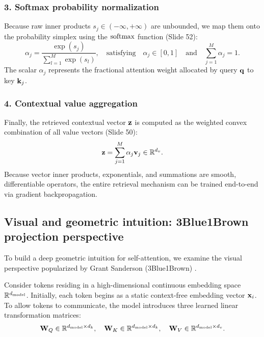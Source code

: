 \documentclass[../../main.tex]{subfiles}
\begin{document}
\subsubsection{3. Softmax probability normalization}
Because raw inner products $s_j \in (-\infty, +\infty)$ are unbounded, we map them onto the probability simplex using the $\operatorname{\mathrm{softmax}}$ function (Slide 52):
\begin{equation}
\label{eq:softmax_weight_def}
\alpha_j = \frac{\exp(s_j)}{\sum_{l=1}^M \exp(s_l)}, \quad \text{satisfying} \quad \alpha_j \in [0, 1] \quad \text{and} \quad \sum_{j=1}^M \alpha_j = 1.
\end{equation}
The scalar $\alpha_j$ represents the fractional attention weight allocated by query $\mathbf{q}$ to key $\mathbf{k}_j$.

\subsubsection{4. Contextual value aggregation}
Finally, the retrieved contextual vector $\mathbf{z}$ is computed as the weighted convex combination of all value vectors (Slide 50):
\begin{equation}
\label{eq:convex_combination_values}
\mathbf{z} = \sum_{j=1}^M \alpha_j \mathbf{v}_j \in \mathbb{R}^{d_v}.
\end{equation}
Because vector inner products, exponentials, and summations are smooth, differentiable operators, the entire retrieval mechanism can be trained end-to-end via gradient backpropagation.

\subsection{Visual and geometric intuition: 3Blue1Brown projection perspective}
\label{subsec:3b1b_geometric_perspective}

To build a deep geometric intuition for self-attention, we examine the visual perspective popularized by Grant Sanderson (3Blue1Brown) \cite{sanderson2024attention}.

Consider tokens residing in a high-dimensional continuous embedding space $\mathbb{R}^{d_{\text{model}}}$. Initially, each token begins as a static context-free embedding vector $\mathbf{x}_i$. To allow tokens to communicate, the model introduces three learned linear transformation matrices:
\begin{equation}
\label{eq:learned_proj_matrices}
\mathbf{W}_Q \in \mathbb{R}^{d_{\text{model}} \times d_k}, \quad \mathbf{W}_K \in \mathbb{R}^{d_{\text{model}} \times d_k}, \quad \mathbf{W}_V \in \mathbb{R}^{d_{\text{model}} \times d_v}.
\end{equation}
\end{document}
